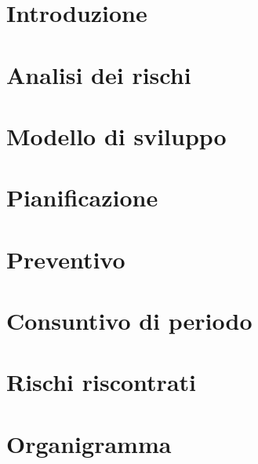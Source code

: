 \documentclass{article}
\begin{document}


\section{Introduzione}
\label{sec:introduzione}


\newpage
\section{Analisi dei rischi}
\label{sec:rischi}


\newpage
\section{Modello di sviluppo}
\label{sec:sviluppo}


\newpage
\section{Pianificazione}
\label{sec:pianif}


\newpage
\section{Preventivo}
\label{sec:prev}


\newpage
\section{Consuntivo di periodo}
\label{sec:cons}


\appendix
\newpage
\section{Rischi riscontrati}
\label{sec:rischi_riscontrati}


\newpage
\section{Organigramma}
\label{sec:org}

\end{document}
